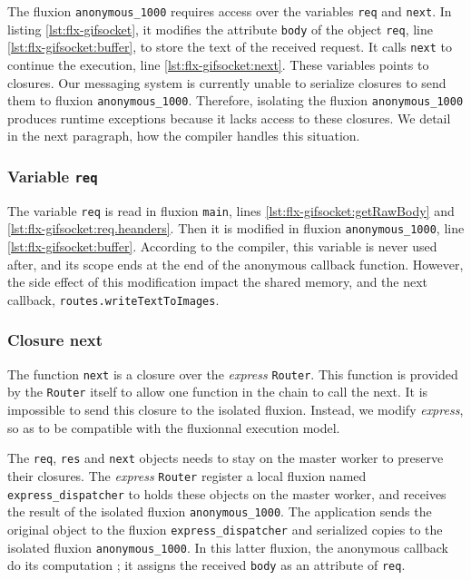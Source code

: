 The fluxion \texttt{anonymous\_1000} requires access over the variables \texttt{req} and \texttt{next}.
In listing \ref{lst:flx-gifsocket}, it modifies the attribute \texttt{body} of the object \texttt{req}, line \ref{lst:flx-gifsocket:buffer}, to store the text of the received request.
It calls \texttt{next} to continue the execution, line \ref{lst:flx-gifsocket:next}.
These variables points to closures.
Our messaging system is currently unable to serialize closures to send them to fluxion \texttt{anonymous\_1000}.
Therefore, isolating the fluxion \texttt{anonymous\_1000} produces runtime exceptions because it lacks access to these closures.
We detail in the next paragraph, how the compiler handles this situation.

\subsubsection{Variable \texttt{req}}

The variable \texttt{req} is read in fluxion \texttt{main}, lines \ref{lst:flx-gifsocket:getRawBody} and \ref{lst:flx-gifsocket:req.heanders}.
Then it is modified in fluxion \texttt{anonymous\_1000}, line \ref{lst:flx-gifsocket:buffer}.
According to the compiler, this variable is never used after, and its scope ends at the end of the anonymous callback function.
However, the side effect of this modification impact the shared memory, and the next callback, \texttt{routes.writeTextToImages}.


\subsubsection{Closure next}

The function \texttt{next} is a closure over the \textit{express} \texttt{Router}.
This function is provided by the \texttt{Router} itself to allow one function in the chain to call the next.
It is impossible to send this closure to the isolated fluxion.
Instead, we modify \textit{express}, so as to be compatible with the fluxionnal execution model.

The \texttt{req}, \texttt{res} and \texttt{next} objects needs to stay on the master worker to preserve their closures.
The \textit{express} \texttt{Router} register a local fluxion named \texttt{express\_dispatcher} to holds these objects on the master worker, and receives the result of the isolated fluxion \texttt{anonymous\_1000}.
The application sends the original object to the fluxion \texttt{express\_dispatcher} and serialized copies to the isolated fluxion \texttt{anonymous\_1000}.
In this latter fluxion, the anonymous callback do its computation ; it assigns the received \texttt{body} as an attribute of \texttt{req}.

